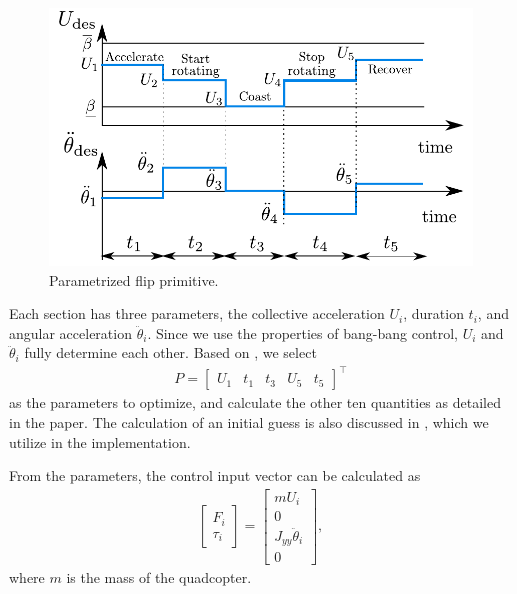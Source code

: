 \begin{figure}
\centering
\includegraphics[scale=.7]{Fig/sections2.pdf}
\caption{Parametrized flip primitive.}\label{fig:sections}
\end{figure}

Each section has three parameters, the collective acceleration $U_i$, duration $t_i$, and angular acceleration $\ddot{\theta}_i$. Since we use the properties of bang-bang control, $U_i$ and $\ddot{\theta}_i$ fully determine each other. Based on \cite{LSICRA2010}, we select 
\begin{align}
P=\begin{bmatrix}\label{eq:openparams}
U_1 & t_1 & t_3 & U_5& t_5
\end{bmatrix} ^\top
\end{align} as the parameters to optimize, and calculate the other ten quantities as detailed in the paper. The calculation of an initial guess is also discussed in \cite{LSICRA2010}, which we utilize in the implementation.

From the parameters, the control input vector can be calculated as
 \begin{align}\label{eq:openinp}
    \begin{bmatrix}
        F_i \\ \tau_i
    \end{bmatrix}=\begin{bmatrix}
        mU_i \\ 0 \\ J_{yy}\ddot{\theta}_i \\ 0
    \end{bmatrix},
\end{align}   
where $m$ is the mass of the quadcopter.

